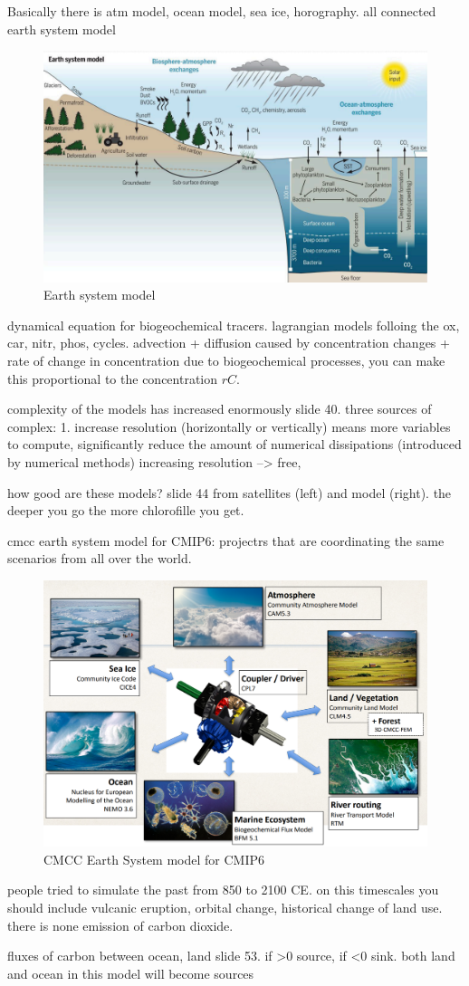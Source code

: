 Basically there is atm model, ocean model, sea ice, horography. all connected earth system model
\begin{figure}[htpb]
	\centering
	\includegraphics[width=0.5\linewidth]{uploads/Earth system model.png}
	\caption{Earth system model}
	\label{fig:enter-label}
\end{figure}
dynamical equation for biogeochemical tracers. lagrangian models folloing the ox, car, nitr, phos, cycles. advection + diffusion caused by concentration changes + rate of change in concentration due to biogeochemical processes, you can make this proportional to the concentration $rC$.

complexity of the models has increased enormously slide 40. three sources of complex:
1. increase resolution (horizontally or vertically) means more variables to compute, significantly reduce the amount of numerical dissipations (introduced by numerical methods) increasing resolution --> free,


how good are these models? slide 44 from satellites (left) and model (right). the deeper you go the more chlorofille you get.

cmcc earth system model for CMIP6: projectrs that are coordinating the same scenarios from all over the world.
\begin{figure}[htpb]
	\centering
	\includegraphics[width=0.5\linewidth]{uploads/CMCC model.png}
	\caption{CMCC Earth System model for CMIP6}
	\label{fig:enter-label}
\end{figure}
people tried to simulate the past from 850 to 2100 CE. on this timescales you should include vulcanic eruption, orbital change, historical change of land use. there is none emission of carbon dioxide.

fluxes of carbon between ocean, land slide 53. if >0 source, if <0 sink. both land and ocean in this model will become sources
